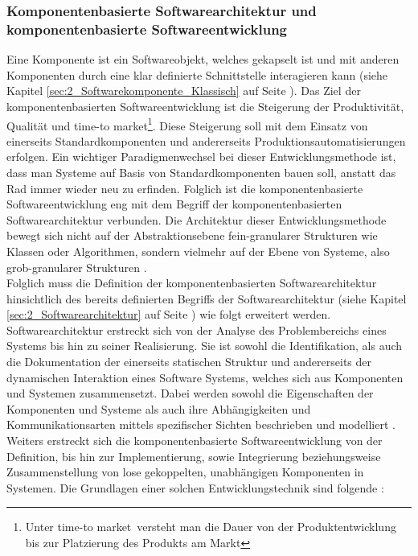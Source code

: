 \subsubsection{Komponentenbasierte Softwarearchitektur und komponentenbasierte Softwareentwicklung}
\label{sec:2_Komponentenbasierte_Softwarearchitektur}
Eine Komponente ist ein Softwareobjekt, welches gekapselt ist und mit anderen Komponenten durch eine klar definierte Schnittstelle interagieren kann (siehe Kapitel \ref{sec:2_Softwarekomponente_Klassisch} auf Seite \pageref{sec:2_Softwarekomponente_Klassisch}). Das Ziel der komponentenbasierten Softwareentwicklung ist die Steigerung der Produktivität, Qualität und \glqq time-to market\footnote{Unter \glqq time-to market\grqq\ versteht man die Dauer von der Produktentwicklung bis zur Platzierung des Produkts am Markt}\grqq . Diese Steigerung soll mit dem Einsatz von einerseits Standardkomponenten und andererseits Produktionsautomatisierungen erfolgen. Ein wichtiger Paradigmenwechsel bei dieser Entwicklungsmethode ist, dass man Systeme auf Basis von Standardkomponenten bauen soll, anstatt das \glqq Rad immer wieder neu zu erfinden\grqq . Folglich ist die komponentenbasierte Softwareentwicklung eng mit dem Begriff der komponentenbasierten Softwarearchitektur verbunden. Die Architektur dieser Entwicklungsmethode bewegt sich nicht auf der Abstraktionsebene fein-granularer Strukturen wie Klassen oder Algorithmen, sondern vielmehr auf der Ebene von Systeme, also grob-granularer Strukturen \citereset \autocite{Sommerville.2011}.\\
Folglich muss die Definition der komponentenbasierten Softwarearchitektur hinsichtlich des bereits definierten Begriffs der Softwarearchitektur (siehe Kapitel \ref{sec:2_Softwarearchitektur} auf Seite \pageref{sec:2_Softwarearchitektur}) wie folgt erweitert werden.
Softwarearchitektur erstreckt sich von der Analyse des Problembereichs eines Systems bis hin zu seiner Realisierung. Sie ist sowohl die Identifikation, als auch die Dokumentation der einerseits statischen Struktur und andererseits der dynamischen Interaktion eines Software Systems, welches sich aus Komponenten und Systemen zusammensetzt. Dabei werden sowohl die Eigenschaften der Komponenten und Systeme als auch ihre Abhängigkeiten und Kommunikationsarten mittels spezifischer Sichten beschrieben und modelliert \citereset \autocite{Andresen.2003}.
Weiters erstreckt sich die komponentenbasierte Softwareentwicklung von der Definition, bis hin zur Implementierung, sowie Integrierung beziehungsweise Zusammenstellung von lose gekoppelten, unabhängigen Komponenten in Systemen. Die Grundlagen einer solchen Entwicklungstechnik sind folgende \citereset \autocite{Sommerville.2011}:
